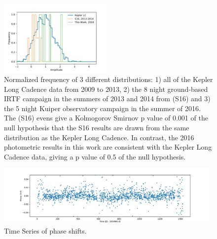 \documentclass[preprint]{aastex61}
\begin{document}
\begin{figure}[!hbtp]
\begin{centering}
\includegraphics[width=0.49\textwidth]{images/kepler/amp_distributions_comparison.pdf}
\caption{Normalized frequency of 3 different distributions: 1) all of the Kepler Long Cadence data from 2009 to 2013, 2) the 8 night ground-based IRTF campaign in the summers of 2013 and 2014 from \citet{schlawin2016kic1255} (S16) and 3) the 5 night Kuiper observatory campaign in the summer of 2016.
The \citet{schlawin2016kic1255} (S16) evens give a Kolmogorov Smirnov p value of 0.001 of the null hypothesis that the S16 results are drawn from the same distribution as the Kepler Long Cadence.
In contrast, the 2016 photometric results in this work are consistent with the Kepler Long Cadence data, giving a  p value of 0.5 of the null hypothesis.}\label{fig:histoPhot}
\end{centering}
\end{figure}


\begin{figure}[!hbtp]
\begin{centering}
\includegraphics[width=0.99\textwidth]{images/kepler/phase_shifts.pdf}
\caption{Time Series of phase shifts.}\label{fig:phaseShift}
\end{centering}
\end{figure}
\end{document}
